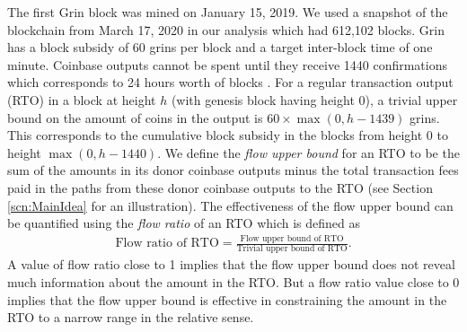 
The first Grin block was mined on January 15, 2019. We used a snapshot of the blockchain from March 17, 2020 in our analysis which had 612,102 blocks. Grin has a block subsidy of 60 grins per block and a target inter-block time of one minute. Coinbase outputs cannot be spent until they receive 1440 confirmations which corresponds to 24 hours worth of blocks \cite{GrinCoinbaseMaturity}. For a regular transaction output (RTO) in a block at height $h$ (with genesis block having height 0), a trivial upper bound on the amount of coins in the output is $60 \times\max(0, h-1439)$ grins. This corresponds to the cumulative block subsidy in the blocks from height 0 to height $\max(0, h-1440)$. We define the \textit{flow upper bound} for an RTO to be the sum of the amounts in its donor coinbase outputs minus the total transaction fees paid in the paths from these donor coinbase outputs to the RTO (see Section \ref{scn:MainIdea} for an illustration). The effectiveness of the flow upper bound can be quantified using the \textit{flow ratio} of an RTO which is defined as
 \begin{align*}
  \text{Flow ratio of RTO} = \frac{\text{Flow upper bound of RTO}}{\text{Trivial upper bound of RTO}}.
\end{align*}
A value of flow ratio close to 1 implies that the flow upper bound does not reveal much information about the amount in the RTO. But a flow ratio value close to 0 implies that the flow upper bound is effective in constraining the amount in the RTO to a narrow range in the relative sense.

